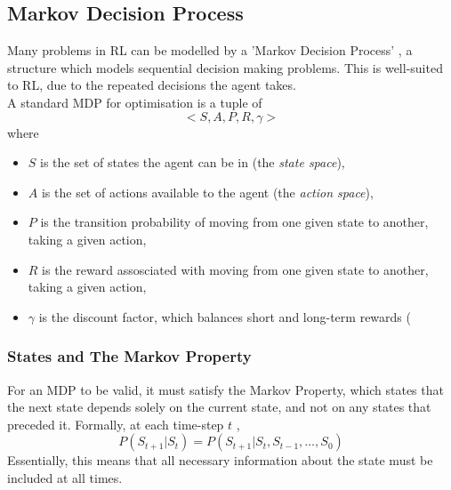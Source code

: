 \subsection{Markov Decision Process}
\label{sec:mdp}
Many problems in RL can be modelled by a 'Markov Decision Process' \cite{bellman1957markovian}, a structure which models sequential decision making problems. This is well-suited to RL, due to the repeated decisions the agent takes.\\ A standard MDP for optimisation is a tuple of
\[ <S, A, P, R, \gamma>\]
where
\begin{itemize}
    \item $S$ is the set of states the agent can be in (the \textit{state space}),
    \item $A$ is the set of actions available to the agent (the \textit{action space}),
    \item $P$ is the transition probability of moving from one given state to another, taking a given action,
    \item $R$ is the reward assosciated with moving from one given state to another, taking a given action,
    \item $\gamma$ is the discount factor, which balances short and long-term rewards (
\end{itemize}
\subsubsection{States and The Markov Property}
For an MDP to be valid, it must satisfy the Markov Property, which states that the next state depends solely on the current state, and not on any states that preceded it. Formally, at each time-step $t$ , $$P(S_{t+1} | S_t) = P(S_{t+1} | S_t, S_{t-1}, \ldots, S_0)$$ Essentially, this means that all necessary information about the state must be included at all times.
